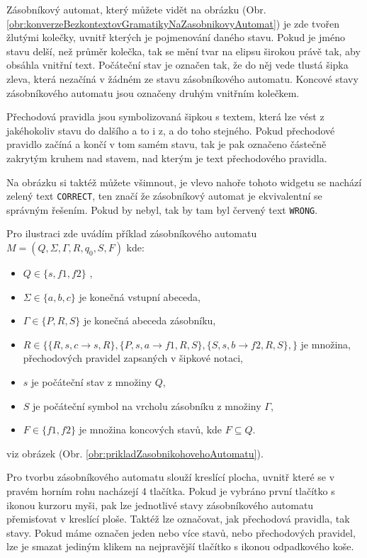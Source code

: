 Zásobníkový automat, který můžete vidět na obrázku (Obr. \ref{obr:konverzeBezkontextovGramatikyNaZasobnikovyAutomat}) je zde tvořen žlutými kolečky, uvnitř kterých je pojmenování daného stavu. Pokud je jméno stavu delší, než průměr kolečka, tak se mění tvar na elipsu širokou právě tak, aby obsáhla vnitřní text. Počáteční stav je označen tak, že do něj vede tlustá šipka zleva, která nezačíná v žádném ze stavu zásobníkového automatu. Koncové stavy zásobníkového automatu jsou označeny druhým vnitřním kolečkem.

Přechodová pravidla jsou symbolizovaná šipkou s textem, která lze vést z jakéhokoliv stavu do dalšího a to i z, a do toho stejného. Pokud přechodové pravidlo začíná a končí v tom samém stavu, tak je pak označeno částečně zakrytým kruhem nad stavem, nad kterým je text přechodového pravidla. 

Na obrázku si taktéž můžete všimnout, je vlevo nahoře tohoto widgetu se nachází zelený text \texttt{CORRECT}, ten značí že zásobníkový automat je ekvivalentní se správným řešením. Pokud by nebyl, tak by tam byl červený text \texttt{WRONG}. 

Pro ilustraci zde uvádím příklad zásobníkového automatu \( M = (Q, \Sigma, \Gamma, R, q_0, S, F) \) kde:
\begin{itemize}
\item \( Q \in \{ s, f1, f2 \} \) ,
\item \( \Sigma \in \{ a, b, c \} \) je konečná vstupní abeceda,
\item \( \Gamma \in \{ P, R, S \} \) je konečná abeceda zásobníku,
\item \( R \in \{ \{ R, s, c \rightarrow s, R \}, \{ P,s,a \rightarrow f1, R, S \}, \{ S, s, b \rightarrow f2, R, S\}, \} \) je množina, přechodových pravidel zapsaných v šipkové notaci,
\item \( s \) je počáteční stav z množiny \( Q \),
\item \( S \) je počáteční symbol na vrcholu zásobníku z množiny \( \Gamma \),
\item \( F \in \{ f1, f2\} \) je množina koncových stavů, kde \( F \subseteq Q \).
\end{itemize}

viz obrázek (Obr. \ref{obr:prikladZasobnikohovehoAutomatu}). 


Pro tvorbu zásobníkového automatu slouží kreslící plocha, uvnitř které se v pravém horním rohu nacházejí 4 tlačítka. Pokud je vybráno první tlačítko s ikonou kurzoru myši, pak lze jednotlivé stavy zásobníkového automatu přemisťovat v kreslící ploše. Taktéž lze označovat, jak přechodová pravidla, tak stavy. Pokud máme označen jeden nebo více stavů, nebo přechodových pravidel, lze je smazat jediným klikem na nejpravější tlačítko s ikonou odpadkového koše.

